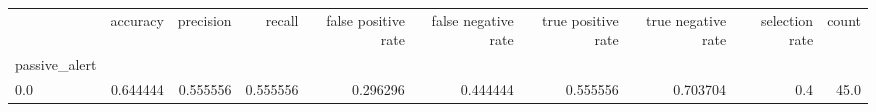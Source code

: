\begin{tabular}{lrrrrrrrrr}
\toprule
{} &  accuracy &  precision &    recall &  false positive rate &  false negative rate &  true positive rate &  true negative rate &  selection rate &  count \\
passive\_alert &           &            &           &                      &                      &                     &                     &                 &        \\
\midrule
0.0           &  0.644444 &   0.555556 &  0.555556 &             0.296296 &             0.444444 &            0.555556 &            0.703704 &             0.4 &   45.0 \\
\bottomrule
\end{tabular}
